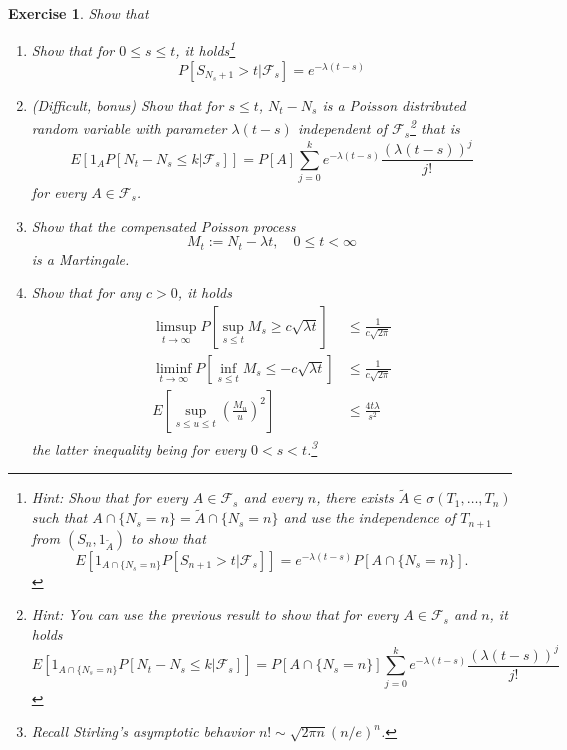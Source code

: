 \documentclass[DIV=classic,a4paper,10pt]{scrartcl}
\newtheorem{exercise}[theorem]{Exercise}
\theoremstyle{nonumberplain}
\numberwithin{equation}{section}
\begin{document}
\begin{exercise}
    Show that
    \begin{enumerate}[label=\textit{(\roman*)}]
        \item Show that for $0\leq s\leq t$, it holds\footnote{Hint: Show that for every $A\in \mathcal{F}_s$ and every $n$, there exists $\tilde{A} \in \sigma(T_1,\ldots, T_n)$ such that $A\cap \{N_s=n\}=\tilde{A}\cap\{N_s=n\}$ and use the independence of $T_{n+1}$ from $(S_n,1_{\tilde{A}})$ to show that
                \begin{equation*}
                    E\left[ 1_{A\cap\{N_s=n\}}P\left[ S_{n+1}>t|\mathcal{F}_s \right] \right]=e^{-\lambda(t-s)}P\left[ A\cap \{N_s=n\} \right].
                \end{equation*}
            }
            \begin{equation*}
                P\left[ S_{N_s+1}>t|\mathcal{F}_s \right]=e^{-\lambda(t-s)}
            \end{equation*}
        \item (Difficult, bonus) Show that for $s\leq t$, $N_t-N_s$ is a Poisson distributed random variable with parameter $\lambda(t-s)$ independent of $\mathcal{F}_s$\footnote{Hint: You can use the previous result to show that for every $A\in \mathcal{F}_s$ and $n$, it holds
                \begin{equation*}
                    E\left[ 1_{A\cap \{N_s=n\}}P\left[ N_t-N_s\leq k|\mathcal{F}_s \right] \right]=P\left[ A\cap\{N_s=n\} \right]\sum_{j=0}^ke^{-\lambda(t-s)}\frac{(\lambda(t-s))^j}{j!}
                \end{equation*}
            } that is
            \begin{equation*}
                E\left[ 1_A P\left[ N_t-N_s\leq k |\mathcal{F}_s \right] \right]=P\left[ A \right]\sum_{j=0}^k e^{-\lambda(t-s)}\frac{(\lambda(t-s))^j}{j!}
            \end{equation*}
            for every $A \in \mathcal{F}_s$.
        \item Show that the compensated Poisson process
            \begin{equation*}
                M_t:=N_t-\lambda t, \quad 0\leq t<\infty
            \end{equation*}
            is a Martingale.
        \item Show that for any $c>0$, it holds
            \begin{align}
                \limsup_{t\to \infty} P\left[ \sup_{s\leq t} M_s \geq c\sqrt{\lambda t} \right] & \leq \frac{1}{c\sqrt{2\pi}}\\
                \liminf_{t \to \infty} P\left[ \inf_{s\leq t} M_s \leq -c\sqrt{\lambda t} \right] & \leq \frac{1}{c\sqrt{2\pi}}\\
                E\left[ \sup_{s\leq u\leq t}\left(\frac{M_u}{u}\right)^2 \right]&\leq \frac{4t\lambda}{s^2}
            \end{align}
            the latter inequality being for every $0<s<t$.\footnote{Recall Stirling's asymptotic behavior $n!\sim \sqrt{2\pi n}(n/e)^n$.}
    \end{enumerate}
\end{exercise}
\end{document}
